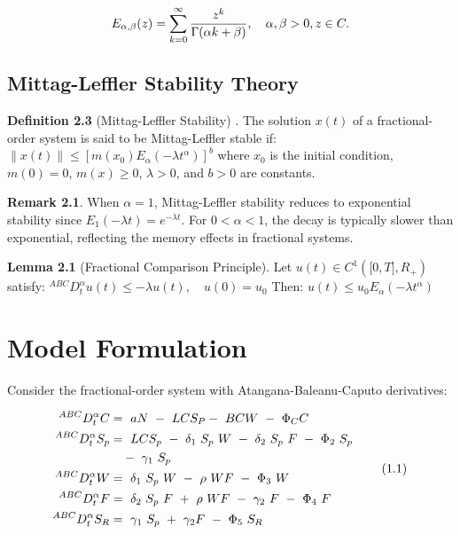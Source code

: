 \documentclass[10pt]{NSP1}
\newcommand{\fitwidth}[1]{\resizebox{\ifdim\width>\linewidth\linewidth\else\width\fi}{!}{#1}}
\begin{document}
\[
\fitwidth{$\displaystyle E_{\alpha,\beta}(z) = \sum_{k = 0}^{\infty}{}\frac{z^{k}}{\Gamma(\alpha k + \beta)},\quad\alpha,\beta > 0,z \in C.$}
\]

\subsection{Mittag-Leffler Stability Theory}

\textbf{Definition 2.3} (Mittag-Leffler Stability) \cite{ref7}. The solution \(x(t)\) of a fractional-order system is said to be Mittag-Leffler stable if: \(\parallel x(t) \parallel \leq \left\lbrack m\left( x_{0} \right)E_{\alpha}\left( - \lambda t^{\alpha} \right) \right\rbrack^{b}\) where \(x_{0}\) is the initial condition, \(m(0) = 0\), \(m(x) \geq 0\), \(\lambda > 0\), and \(b > 0\) are constants.

\textbf{Remark 2.1}. When \(\alpha = 1\), Mittag-Leffler stability reduces to exponential stability since \(E_{1}( - \lambda t) = e^{- \lambda t}\). For \(0 < \alpha < 1\), the decay is typically slower than exponential, reflecting the memory effects in fractional systems.

\textbf{Lemma 2.1} (Fractional Comparison Principle). \cite{ref11} Let \(u(t) \in C^{1}\left( \lbrack 0,T\rbrack,R_{+} \right)\) satisfy: \(^{ABC}D_{t}^{\alpha}u(t) \leq - \lambda u(t),\quad u(0) = u_{0}\) Then: \(u(t) \leq u_{0}E_{\alpha}\left( - \lambda t^{\alpha} \right)\)

\section{Model Formulation}

Consider the fractional-order system with Atangana-Baleanu-Caputo derivatives:

\begin{equation}
\fitwidth{$\displaystyle \begin{aligned}
{}^{ABC}D_{t}^{\alpha}C &= \ aN\  - \ LCS_{P} - \ BCW\  - \ \Phi_{C}C \\
{}^{ABC}D_{t}^{\alpha}S_{p} &= \ LCS_{p}\  - \ \delta_{1}\ S_{p}\ W\  - \ \delta_{2}\ S_{p}\ F\  - \ \Phi_{2}\ S_{p}\ \\
&\quad - \ \gamma_{1}\ S_{p} \\
{}^{ABC}D_{t}^{\alpha}W &= \ \delta_{1}\ S_{p}\ W\  - \ \rho\ WF\  - \ \Phi_{3}\ W \\
{}^{ABC}D_{t}^{\alpha}F &= \ \delta_{2}\ S_{p}\ F\  + \ \rho\ WF\  - \ \gamma_{2}\ F\  - \ \Phi_{4}\ F \\
{}^{ABC}D_{t}^{\alpha}S_{R} &= \ \gamma_{1}\ S_{p}\  + \ \gamma_{2}F\  - \ \Phi_{5}\ S_{R}
\end{aligned}$}
\tag{1.1}
\end{equation}
\end{document}
